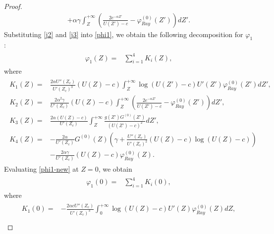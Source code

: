\documentclass[reqno,11pt]{amsart}
\numberwithin{equation}{section}
\numberwithin{equation}{section}
\theoremstyle{plain}
\begin{document}
\begin{proof}
\begin{align}
							+\alpha\gamma\int_{Z}^{+\infty}\left(\frac{2e^{-\alpha Z'}}{U(Z')-c}-\varphi_{Ray}^{(0)}(Z')\right)dZ'.\label{j3}
						\end{align}
					Substituting \eqref{j2} and \eqref{j3} into \eqref{phi1}, we obtain the following decomposition for $\varphi_1$:
						\begin{align}\label{phi1-new}\begin{aligned}
								\varphi_1(Z)= &\sum_{i=1}^{4}K_i(Z), %
						\end{aligned}\end{align} 
						where
						\begin{align}\begin{aligned}
								K_1(Z)= &\frac{2\alpha U''(Z_c)}{U'(Z_c)^3}(U(Z)-c)\int_{Z}^{+\infty}
								\log(U(Z')-c)
								U'(Z')\varphi_{Ray}^{(0)}(Z')dZ',\\
								K_2(Z)= &\frac{2\alpha^2\gamma}{U'(Z_c)}(U(Z)-c)\int_{Z}^{+\infty}\left(\frac{2e^{-\alpha Z'}}{U(Z')-c}-\varphi_{Ray}^{(0)}(Z')\right)dZ',\\
								K_3(Z)=&\frac{2\alpha (U(Z)-c)}{U'(Z_c)}\int_{Z}^{+\infty}\frac{g(Z')G^{(0)}(Z')}{(U(Z')-c)^2}dZ',\\
								K_4(Z) =& -\frac{2\alpha }{U'(Z_c)}G^{(0)}(Z)\left(\gamma+\frac{U''(Z_c)}{U'(Z_c)^2}(U(Z)-c)\log(U(Z)-c)\right)\\
								&-\frac{2\alpha\gamma}{U'(Z_c)}(U(Z)-c)\varphi_{Ray}^{(0)}(Z).\nonumber
						\end{aligned}\end{align}
Evaluating \eqref{phi1-new} at $Z=0$, we obtain
			\begin{align}\label{est-phi1-0}\begin{aligned}
					\varphi_1(0)= & \sum_{i=1}^{4}K_i(0),
						\end{aligned}\end{align}
		where
			\begin{align}\begin{aligned}
					K_1(0)= &-\frac{2\alpha c U''(Z_c)}{U'(Z_c)^3}\int_{0}^{+\infty}
					\log(U(Z)-c) U'(Z)\varphi_{Ray}^{(0)}(Z)dZ,\\

\end{aligned}
\end{align}
\end{proof}
\end{document}
